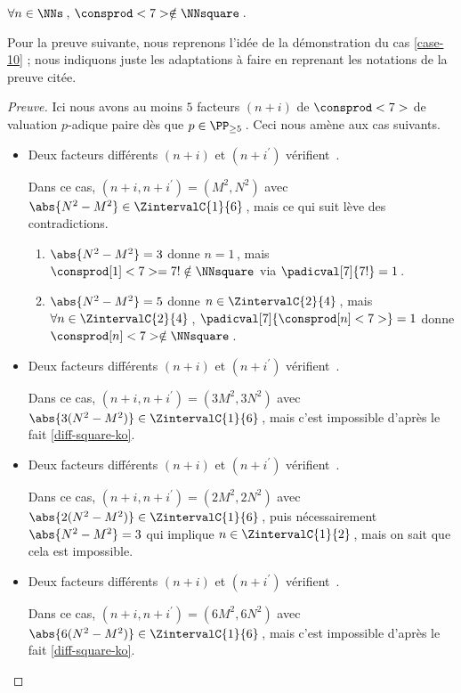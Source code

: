 \begin{fact} \label{case-7}
	 $\forall n \in \NNs$\,, $\consprod<7> \notin \NNsquare$\,.
\end{fact}




Pour la preuve suivante, nous reprenons l'idée de la démonstration du cas \ref{case-10} ; nous indiquons juste les adaptations à faire en reprenant les notations de la preuve citée.


\begin{proof}[Preuve]%
    Ici nous avons au moins $5$ facteurs $(n + i)$ de $\consprod<7>$ de valuation $p$-adique paire dès que $p \in \PP_{\geq 5}$\,.
    Ceci nous amène aux cas suivants.
    \begin{itemize}
    	\medskip
		\item Deux facteurs différents $(n+i)$ et $(n+i^\prime)$ vérifient \,.
		
		\smallskip
		\noindent
		Dans ce cas, $(n+i, n+i^\prime) = (M^2, N^2)$ avec $\abs{N^2 - M^2} \in \ZintervalC{1}{6}$\,, mais ce qui suit lève des contradictions.
		\begin{enumerate}
			\item $\abs{N^2 - M^2} = 3$ donne $n = 1$\,, mais $\consprod[1]<7> = 7! \notin \NNsquare$ via $\padicval[7]{7!} = 1$\,.


			\item $\abs{N^2 - M^2} = 5$ donne $n \in \ZintervalC{2}{4}$\,, mais $\forall n \in \ZintervalC{2}{4}$\,, $\padicval[7]{\consprod[n]<7>} = 1$ donne $\consprod[n]<7> \notin \NNsquare$\,.
		\end{enumerate}


    	\medskip
		\item Deux facteurs différents $(n+i)$ et $(n+i^\prime)$ vérifient \,.
		
		\smallskip
		\noindent
		Dans ce cas, $(n+i, n+i^\prime) = (3 M^2, 3 N^2)$ avec $\abs{3(N^2 - M^2)} \in \ZintervalC{1}{6}$\,, mais c'est impossible d'après le fait \ref{diff-square-ko}.

    	\medskip
		\item Deux facteurs différents $(n+i)$ et $(n+i^\prime)$ vérifient \,.
		
		\smallskip
		\noindent
		Dans ce cas, $(n+i, n+i^\prime) = (2 M^2, 2 N^2)$ avec $\abs{2(N^2 - M^2)} \in \ZintervalC{1}{6}$\,, puis nécessairement $\abs{N^2 - M^2} = 3$ qui implique $n \in \ZintervalC{1}{2}$\,, mais on sait que cela est impossible.


    	\medskip
		\item Deux facteurs différents $(n+i)$ et $(n+i^\prime)$ vérifient \,.
		
		\smallskip
		\noindent
		Dans ce cas, $(n+i, n+i^\prime) = (6 M^2, 6 N^2)$ avec $\abs{6(N^2 - M^2)} \in \ZintervalC{1}{6}$\,, mais c'est impossible d'après le fait \ref{diff-square-ko}.
		\qedhere
    \end{itemize}
\end{proof}

 